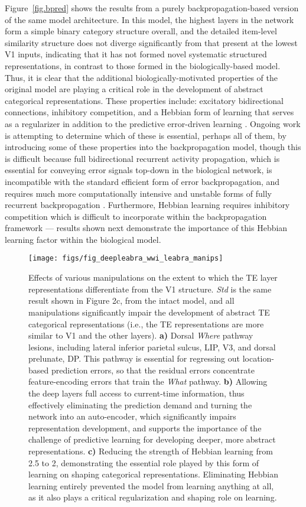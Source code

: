 \documentclass[11pt,twoside]{article}
\newif\myifpdf
\begin{document}
Figure~\ref{fig.bpred} shows the results from a purely backpropagation-based version of the same model architecture.  In this model, the highest layers in the network form a simple binary category structure overall, and the detailed item-level similarity structure does not diverge significantly from that present at the lowest V1 inputs, indicating that it has not formed novel systematic structured representations, in contrast to those formed in the biologically-based model.  Thus, it is clear that the additional biologically-motivated properties of the original model are playing a critical role in the development of abstract categorical representations. These properties include: excitatory bidirectional connections, inhibitory competition, and a Hebbian form of learning that serves as a regularizer in addition to the predictive error-driven learning \cite{OReilly98,OReillyMunakata00}.  Ongoing work is attempting to determine which of these is essential, perhaps all of them, by introducing some of these properties into the backpropagation model, though this is difficult because full bidirectional recurrent activity propagation, which is essential for conveying error signals top-down in the biological network, is incompatible with the standard efficient form of error backpropagation, and requires much more computationally intensive and unstable forms of fully recurrent backpropagation \cite{WilliamsZipser92,Pineda87}.  Furthermore, Hebbian learning requires inhibitory competition which is difficult to incorporate within the backpropagation framework --- results shown next demonstrate the importance of this Hebbian learning factor within the biological model.

\begin{figure}
  \centering\texttt{[image: figs/fig\_deepleabra\_wwi\_leabra\_manips]}
  \caption{\small Effects of various manipulations on the extent to which the TE layer representations differentiate from the V1 structure.  {\em Std} is the same result shown in Figure 2c, from the intact model, and all manipulations significantly impair the development of abstract TE categorical representations (i.e., the TE representations are more similar to V1 and the other layers).  {\bf a)} Dorsal {\em Where} pathway lesions, including lateral inferior parietal sulcus, LIP, V3, and dorsal prelunate, DP.  This pathway is essential for regressing out location-based prediction errors, so that the residual errors concentrate feature-encoding errors that train the {\em What} pathway.  {\bf b)} Allowing the deep layers full access to current-time information, thus effectively eliminating the prediction demand and turning the network into an auto-encoder, which significantly impairs representation development, and supports the importance of the challenge of predictive learning for developing deeper, more abstract representations.  {\bf c)} Reducing the strength of Hebbian learning from 2.5 to 2, demonstrating the essential role played by this form of learning on shaping categorical representations.  Eliminating Hebbian learning entirely prevented the model from learning anything at all, as it also plays a critical regularization and shaping role on learning.}
  \label{fig.manips}
\end{figure}
\end{document}
